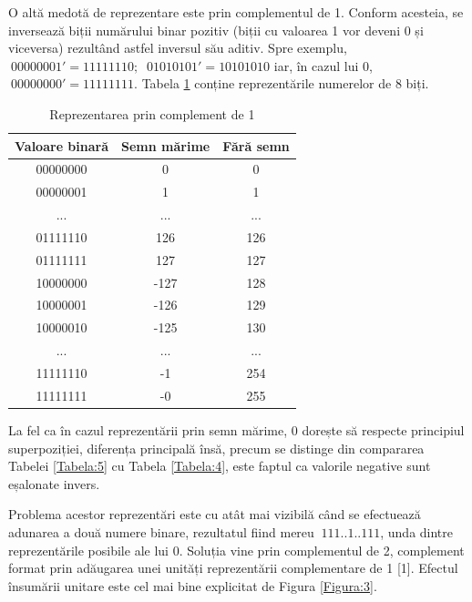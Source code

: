 \documentclass[12pt]{article}
\begin{document}
O altă medotă de reprezentare este prin complementul de 1. Conform acesteia, se inversează biții numărului binar pozitiv (biții cu valoarea 1 vor deveni 0 și viceversa) rezultând astfel inversul său aditiv. Spre exemplu, $\ 00000001' = 11111110;$ $\ 01010101' = 10101010$ iar, în cazul lui 0, $\ 00000000' = 11111111$. Tabela \ref{Tabela:6} conține reprezentările numerelor de 8 biți.
\begin{table}[h]
\centering
\begin{tabular}{ ||c|c|c|| }
 \hline
 Valoare binară & Semn mărime &  Fără semn\\ 
 \hline  \hline
 00000000 & 0 & 0\\
 \hline
 00000001 & 1  & 1\\
 \hline
  ... &  ... & ... \\
 \hline
 01111110 & 126 & 126 \\
 \hline
 01111111 & 127 & 127 \\
 \hline
 10000000 & -127 & 128 \\
 \hline
 10000001 & -126 & 129 \\
 \hline
 10000010 & -125 & 130 \\
 \hline
   ... &  ... & ... \\
 \hline
 11111110 & -1 & 254 \\
 \hline
 11111111 & -0 & 255 \\
 \hline
\end{tabular}
\caption{Reprezentarea prin complement de 1 }
\label{Tabela:6}
\end{table}

La fel ca în cazul reprezentării prin semn mărime, 0 dorește să respecte principiul superpoziției, diferența principală însă, precum se distinge din compararea Tabelei \ref{Tabela:5} cu  Tabela \ref{Tabela:4}, este faptul ca valorile negative sunt eșalonate invers.

Problema acestor reprezentări este cu atât mai vizibilă când se efectuează adunarea a două numere binare, rezultatul fiind mereu $\ 111..1..111$, unda dintre reprezentările posibile ale lui 0. Soluția vine prin complementul de 2, complement format prin adăugarea unei unități reprezentării complementare de 1 [1]. Efectul însumării unitare este cel mai bine explicitat de Figura \ref{Figura:3}.
 
\end{document}
